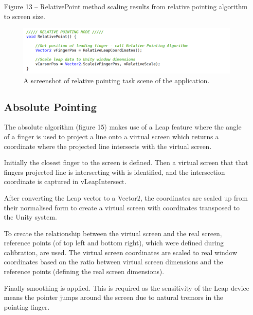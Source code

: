 \documentclass{article}
\begin{document}
Figure 13 – RelativePoint method scaling results from relative pointing algorithm to screen size.
\begin{figure}[!h]
    \centering
    \includegraphics[width=7.0in]{Figure_12}
    \caption{A screenshot of relative pointing task scene of the application.}
\end{figure}


\subsection{Absolute Pointing}
The absolute algorithm (figure 15) makes use of a Leap feature where the angle of a finger is used to project a line onto a virtual screen which returns a coordinate where the projected line intersects with the virtual screen.
 
Initially the closest finger to the screen is defined. Then a virtual screen that that fingers projected line is intersecting with is identified, and the intersection coordinate is captured in vLeapIntersect.
 
After converting the Leap vector to a Vector2, the coordinates are scaled up from their normalised form to create a virtual screen with coordinates transposed to the Unity system.
 
To create the relationship between the virtual screen and the real screen, reference points (of top left and bottom right), which were defined during calibration, are used. The virtual screen coordinates are scaled to real window coordinates based on the ratio between virtual screen dimensions and the reference points (defining the real screen dimensions).
 
Finally smoothing is applied. This is required as the sensitivity of the Leap device means the pointer jumps around the screen due to natural tremors in the pointing finger.
\end{document}
